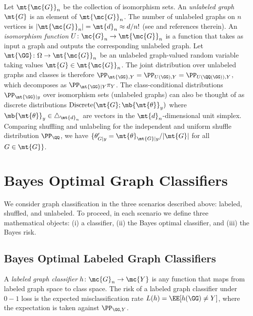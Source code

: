 \documentclass[10pt,journal,cspaper,compsoc]{IEEEtran}
\begin{document}
Let $\mt{\mc{G}}_n$ be the collection of isomorphism sets.
An \emph{unlabeled graph} $\mt{G}$ is an element of $\mt{\mc{G}}_n$. The number of unlabeled graphs on $n$ vertices is $|\mt{\mc{G}}_n|=\mt{d}_n \approx d/n!$ (see \cite{oeis.org/A000088} and references therein).
An \emph{isomorphism function} $U\colon \mc{G}_n \to \mt{\mc{G}}_n$ is a function that takes as input a graph and outputs the corresponding unlabeled graph. Let $\mt{\GG}\colon \Omega \to \mt{\mc{G}}_n$ be an unlabeled graph-valued random variable taking values $\mt{G} \in \mt{\mc{G}}_n$.   The joint distribution over unlabeled graphs and classes is therefore
$\PP_{\mt{\GG},Y}=\PP_{U(\GG),Y}=\PP_{U(\QQ(\GG)),Y}$, which decomposes as $\PP_{\mt{\GG}|Y} \pi_Y$. The class-conditional distributions $\PP_{\mt{\GG} | y}$ over isomorphism sets (unlabeled graphs) can also be thought of as discrete distributions $\text{Discrete}(\mt{G}; \mb{\mt{\theta}}_y)$ where $\mb{\mt{\theta}}_y\in \triangle_{\mt{d}_n}$ are vectors in the $\mt{d}_n$-dimensional unit simplex.   Comparing shuffling and unlabeling for the independent and uniform shuffle distribution $\PP_{\QQ}$, we have $\{\theta_{G|y}'=\mt{\theta}_{\mt{G}|y}/|\mt{G}|$ for all $G \in \mt{G}\}$.  




\section{Bayes Optimal Graph Classifiers} %
\label{sec:bayes_optimal_graph_classifiers}

We consider graph classification in the three scenarios described above: labeled, shuffled, and unlabeled.  To proceed, in each scenario we define three mathematical objects: (i) a classifier, (ii) the Bayes optimal classifier, and (iii) the Bayes risk.

\subsection{Bayes Optimal Labeled Graph Classifiers} %
\label{sub:labeled_graph_classifiers}


	A \emph{labeled graph classifier} $h\colon \mc{G}_n \to \mc{Y}$ is any function that maps from labeled graph space to class space. The risk of a labeled graph classifier under $0-1$ loss is the expected misclassification rate $L(h)=\EE[h(\GG)\neq Y]$, where the expectation is taken against $\PP_{\GG,Y}$.
	
\end{document}
